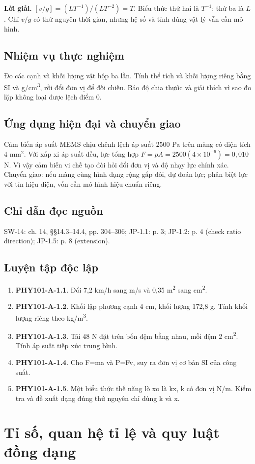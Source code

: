 \documentclass[11pt,a4paper,openany]{book}
\begin{document}
\textbf{Lời giải.} $[v/g]=(LT^{-1})/(LT^{-2})=T$. Biểu thức thứ hai là $T^{-1}$; thứ ba là $L$. Chỉ $v/g$ có thứ nguyên thời gian, nhưng hệ số và tính đúng vật lý vẫn cần mô hình.
\section{Nhiệm vụ thực nghiệm}
Đo các cạnh và khối lượng vật hộp ba lần. Tính thể tích và khối lượng riêng bằng SI và g/cm\textsuperscript{3}, rồi đổi đơn vị để đối chiếu. Báo độ chia thước và giải thích vì sao đo lặp không loại được lệch điểm 0.
\section{Ứng dụng hiện đại và chuyển giao}
Cảm biến áp suất MEMS chịu chênh lệch áp suất 2500 Pa trên màng có diện tích 4 mm$^2$. Với xấp xỉ áp suất đều, lực tổng hợp $F=pA=2500(4\times10^{-6})=0{,}010$ N. Vì vậy cảm biến vi chế tạo đòi hỏi đổi đơn vị và độ nhạy lực chính xác. Chuyển giao: nếu màng cùng hình dạng rộng gấp đôi, dự đoán lực; phân biệt lực với tín hiệu điện, vốn cần mô hình hiệu chuẩn riêng.
\section{Chỉ dẫn đọc nguồn}
SW-14: ch. 14, §§14.3–14.4, pp. 304–306; JP-1.1: p. 3; JP-1.2: p. 4 (check ratio direction); JP-1.5: p. 8 (extension).
\section{Luyện tập độc lập}
\begin{enumerate}
\item \textbf{PHY101-A-1.1}. Đổi 7,2 km/h sang m/s và 0,35 m\textsuperscript{2} sang cm\textsuperscript{2}.
\item \textbf{PHY101-A-1.2}. Khối lập phương cạnh 4 cm, khối lượng 172,8 g. Tính khối lượng riêng theo kg/m\textsuperscript{3}.
\item \textbf{PHY101-A-1.3}. Tải 48 N đặt trên bốn đệm bằng nhau, mỗi đệm 2 cm\textsuperscript{2}. Tính áp suất tiếp xúc trung bình.
\item \textbf{PHY101-A-1.4}. Cho F=ma và P=Fv, suy ra đơn vị cơ bản SI của công suất.
\item \textbf{PHY101-A-1.5}. Một biểu thức thế năng lò xo là kx, k có đơn vị N/m. Kiểm tra và đề xuất dạng đúng thứ nguyên chỉ dùng k và x.
\end{enumerate}
\chapter{Tỉ số, quan hệ tỉ lệ và quy luật đồng dạng}
\end{document}
